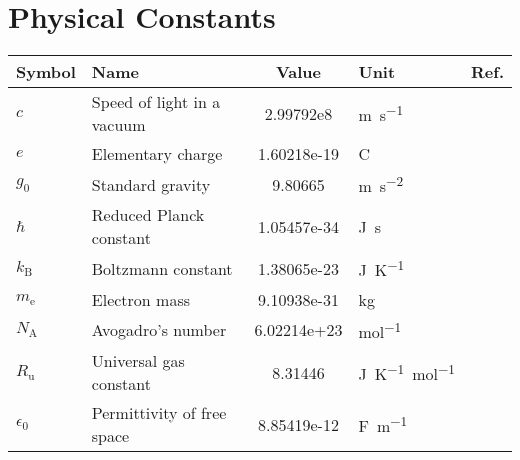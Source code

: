 \section*{Physical Constants}
    {\centering{}
        \begin{tabularx}{\textwidth}{@{}lXS[table-format = 1.5e4]@{ }lr@{}}
            \toprule
            Symbol      & Name    & {Value}     & Unit  & Ref. \\
            \midrule
            $c$ &              Speed of light in a vacuum   & 2.99792e8     & \unit{m.s^{-1}} & \cite{tiesingaFundamentalPhysicalConstants2019} \\
            $e$ &              Elementary charge            & 1.60218e-19   & \unit{C} & \cite{tiesingaFundamentalPhysicalConstants2019} \\
            $g_0$ &            Standard gravity             & 9.80665       & \unit{m.s^{-2}} & \cite{tiesingaFundamentalPhysicalConstants2019} \\
            $\hbar$ &          Reduced Planck constant      & 1.05457e-34   & \unit{J.s} & \cite{tiesingaFundamentalPhysicalConstants2019} \\
            $k_\mathrm{B}$ &   Boltzmann constant           & 1.38065e-23   & \unit{J.K^{-1}} & \cite{tiesingaFundamentalPhysicalConstants2019} \\
            $m_\mathrm{e}$ &    Electron mass               & 9.10938e-31   & \unit{kg} & \cite{tiesingaFundamentalPhysicalConstants2019} \\
            $N_\mathrm{A}$ &   Avogadro's number            & 6.02214e+23   & \unit{mol^{-1}} & \cite{tiesingaFundamentalPhysicalConstants2019} \\
            $R_\mathrm{u}$ &   Universal gas constant       & 8.31446       & \unit{J.K^{-1}.mol^{-1}} & \cite{tiesingaFundamentalPhysicalConstants2019} \\
            $\epsilon_0$ &     Permittivity of free space   & 8.85419e-12   & \unit{F.m^{-1}} & \cite{tiesingaFundamentalPhysicalConstants2019} \\
            \bottomrule
        \end{tabularx}
    }
    \bigskip

